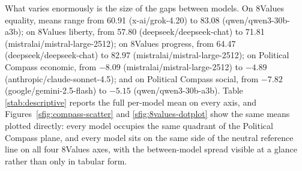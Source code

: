 \documentclass[11pt]{article}
\begin{document}
What varies enormously is the size of the gaps between models. On 8Values
equality, means range from 60.91 (x-ai/grok-4.20) to 83.08
(qwen/qwen3-30b-a3b); on 8Values liberty, from 57.80 (deepseek/deepseek-chat)
to 71.81 (mistralai/mistral-large-2512); on 8Values progress, from 64.47
(deepseek/deepseek-chat) to 82.97 (mistralai/mistral-large-2512); on
Political Compass economic, from $-8.09$ (mistralai/mistral-large-2512) to
$-4.89$ (anthropic/claude-sonnet-4.5); and on Political Compass social, from
$-7.82$ (google/gemini-2.5-flash) to $-5.15$ (qwen/qwen3-30b-a3b). Table
\ref{stab:descriptive} reports the full per-model mean on every axis, and
Figures~\ref{sfig:compass-scatter} and \ref{sfig:8values-dotplot} show the
same means plotted directly: every model occupies the same quadrant of the
Political Compass plane, and every model sits on the same side of the
neutral reference line on all four 8Values axes, with the between-model
spread visible at a glance rather than only in tabular form.
\end{document}
